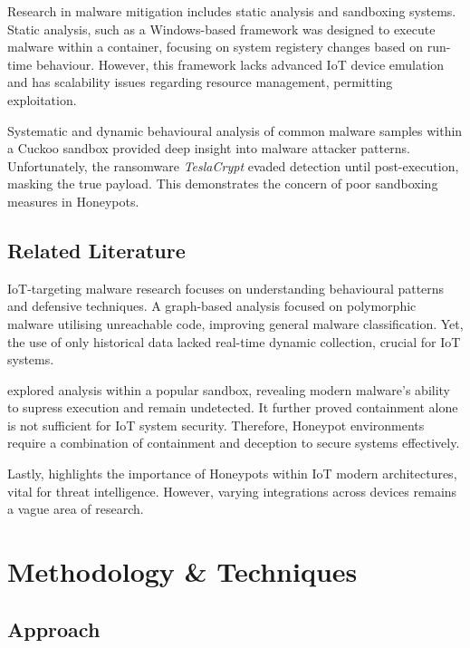 \documentclass[a4paper,12pt,oneside]{book}			%
\begin{document}
Research in malware mitigation includes static analysis and sandboxing systems. Static analysis, such as a Windows-based framework \textit{\citep{static-analysis-drawbacks}} was designed to execute malware within a container, focusing on system registery changes based on run-time behaviour. However, this framework lacks advanced IoT device emulation and has scalability issues regarding resource management, permitting exploitation. 


Systematic and dynamic behavioural analysis of common malware samples \textit{\citep{analysis-mitigation-sandbox-evasion}} within a Cuckoo sandbox provided deep insight into malware attacker patterns. Unfortunately, the ransomware \textit{TeslaCrypt} evaded detection until post-execution, masking the true payload. This demonstrates the concern of poor sandboxing measures in Honeypots. 


\section{Related Literature}\label{sec:relatedLiterature}

IoT-targeting malware research focuses on understanding behavioural patterns and defensive techniques. A graph-based analysis \textit{\citep{cornell-malware-analysis}} focused on polymorphic malware utilising unreachable code, improving general malware classification. Yet, the use of only historical data lacked real-time dynamic collection, crucial for IoT systems.

\textit{\citep{analysis-mitigation-sandbox-evasion}} explored analysis within a popular sandbox, revealing modern malware’s ability to supress execution and remain undetected. It further proved containment alone is not sufficient for IoT system security. Therefore, Honeypot environments require a combination of containment and deception to secure systems effectively.

Lastly, \textit{\citep{crowdstrike-honeypot}} highlights the importance of Honeypots within IoT modern architectures, vital for threat intelligence. However, varying integrations across devices remains a vague area of research. 



\chapter{Methodology \&{} Techniques}\label{ch:methods}
\section{Approach}\label{sec:approach}
\end{document}
